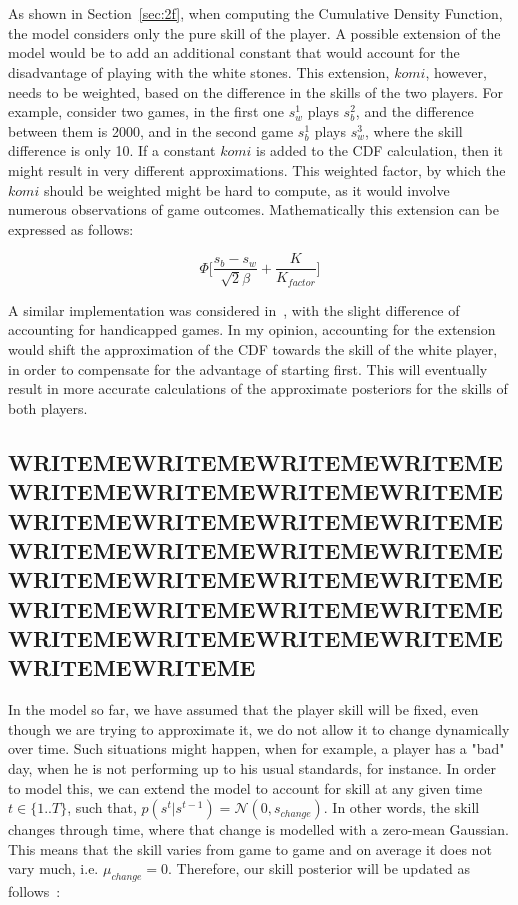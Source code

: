 \documentclass[a4paper,11pt]{article}
\theoremstyle{mytheor}
\begin{document}
\section{}

\subsection{}
As shown in Section~\ref{sec:2f}, when computing the Cumulative Density Function, the model considers only the pure skill of the player. A possible extension of the model would be to add an additional constant that would account for the disadvantage of playing with the white stones. This extension, $komi$, however, needs to be weighted, based on the difference in the skills of the two players. For example, consider two games, in the first one $s_w^1$ plays $s_b^2$, and the difference between them is 2000, and in the second game $s_b^1$ plays $s_w^3$, where the skill difference is only 10. If a constant $komi$ is added to the CDF calculation, then it might result in very different approximations. This weighted factor, by which the $komi$ should be weighted might be hard to compute, as it would involve numerous observations of game outcomes. Mathematically this extension can be expressed as follows:

\begin{equation}
    \Phi \Big[ \frac{s_b - s_w}{\sqrt{2}\beta} + \frac{K}{K_{factor}} \Big]
\end{equation}

A similar implementation was considered in~\cite{stanescu2011rating}, with the slight difference of accounting for handicapped games. In my opinion, accounting for the extension would shift the approximation of the CDF towards the skill of the white player, in order to compensate for the advantage of starting first. This will eventually result in more accurate calculations of the approximate posteriors for the skills of both players.

\subsection{WRITEMEWRITEMEWRITEMEWRITEMEWRITEMEWRITEMEWRITEMEWRITEMEWRITEMEWRITEMEWRITEMEWRITEMEWRITEMEWRITEMEWRITEMEWRITEMEWRITEMEWRITEMEWRITEMEWRITEMEWRITEMEWRITEMEWRITEMEWRITEMEWRITEMEWRITEMEWRITEMEWRITEMEWRITEMEWRITEME}
In the model so far, we have assumed that the player skill will be fixed, even though we are trying to approximate it, we do not allow it to change dynamically over time. Such situations might happen, when for example, a player has a "bad" day, when he is not performing up to his usual standards, for instance. In order to model this, we can extend the model to account for skill at any given time $t \in \{1..T\}$, such that, $p(s^t|s^{t-1})=\mathcal{N}(0, s_{change})$. In other words, the skill changes through time, where that change is modelled with a zero-mean Gaussian. This means that the skill varies from game to game and on average it does not vary much, i.e. $\mu_{change}=0$. Therefore, our skill posterior will be updated as follows~\cite{bishop2013model}:
\end{document}
